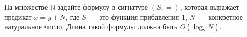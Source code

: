 На множестве $\mathbb{N}$ задайте формулу в сигнатуре $(S, =)$, которая выражает предикат $x = y + N$, где $S$~--- это
функция прибавления $1$, $N$~--- конкретное натуральное число. Длина такой формулы должна быть $O(\log_2 N)$.